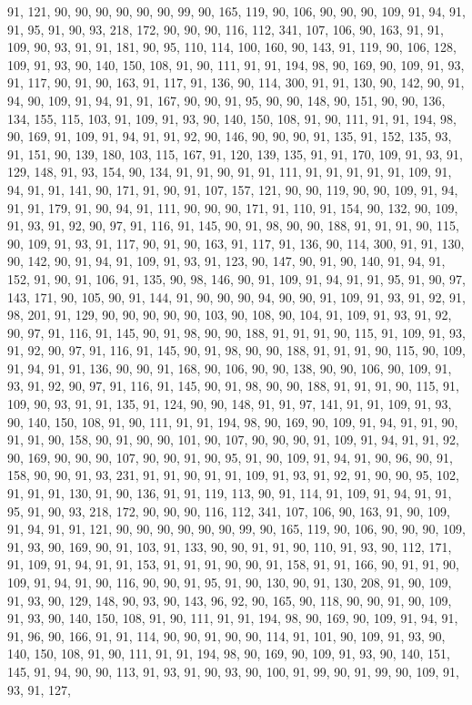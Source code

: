 \begin{sloppypar}
91, 121, 90, 90, 90, 90, 90, 90, 99, 90, 165, 119, 90, 106, 90, 90, 90, 109, 91, 94, 91, 91, 95, 91, 90, 93, 218, 172, 90, 90, 90, 116, 112, 341, 107, 106, 90, 163, 91, 91, 109, 90, 93, 91, 91, 181, 90, 95, 110, 114, 100, 160, 90, 143, 91, 119, 90, 106, 128, 109, 91, 93, 90, 140, 150, 108, 91, 90, 111, 91, 91, 194, 98, 90, 169, 90, 109, 91, 93, 91, 117, 90, 91, 90, 163, 91, 117, 91, 136, 90, 114, 300, 91, 91, 130, 90, 142, 90, 91, 94, 90, 109, 91, 94, 91, 91, 167, 90, 90, 91, 95, 90, 90, 148, 90, 151, 90, 90, 136, 134, 155, 115, 103, 91, 109, 91, 93, 90, 140, 150, 108, 91, 90, 111, 91, 91, 194, 98, 90, 169, 91, 109, 91, 94, 91, 91, 92, 90, 146, 90, 90, 90, 91, 135, 91, 152, 135, 93, 91, 151, 90, 139, 180, 103, 115, 167, 91, 120, 139, 135, 91, 91, 170, 109, 91, 93, 91, 129, 148, 91, 93, 154, 90, 134, 91, 91, 90, 91, 91, 111, 91, 91, 91, 91, 91, 109, 91, 94, 91, 91, 141, 90, 171, 91, 90, 91, 107, 157, 121, 90, 90, 119, 90, 90, 109, 91, 94, 91, 91, 179, 91, 90, 94, 91, 111, 90, 90, 90, 171, 91, 110, 91, 154, 90, 132, 90, 109, 91, 93, 91, 92, 90, 97, 91, 116, 91, 145, 90, 91, 98, 90, 90, 188, 91, 91, 91, 90, 115, 90, 109, 91, 93, 91, 117, 90, 91, 90, 163, 91, 117, 91, 136, 90, 114, 300, 91, 91, 130, 90, 142, 90, 91, 94, 91, 109, 91, 93, 91, 123, 90, 147, 90, 91, 90, 140, 91, 94, 91, 152, 91, 90, 91, 106, 91, 135, 90, 98, 146, 90, 91, 109, 91, 94, 91, 91, 95, 91, 90, 97, 143, 171, 90, 105, 90, 91, 144, 91, 90, 90, 90, 94, 90, 90, 91, 109, 91, 93, 91, 92, 91, 98, 201, 91, 129, 90, 90, 90, 90, 90, 103, 90, 108, 90, 104, 91, 109, 91, 93, 91, 92, 90, 97, 91, 116, 91, 145, 90, 91, 98, 90, 90, 188, 91, 91, 91, 90, 115, 91, 109, 91, 93, 91, 92, 90, 97, 91, 116, 91, 145, 90, 91, 98, 90, 90, 188, 91, 91, 91, 90, 115, 90, 109, 91, 94, 91, 91, 136, 90, 90, 91, 168, 90, 106, 90, 90, 138, 90, 90, 106, 90, 109, 91, 93, 91, 92, 90, 97, 91, 116, 91, 145, 90, 91, 98, 90, 90, 188, 91, 91, 91, 90, 115, 91, 109, 90, 93, 91, 91, 135, 91, 124, 90, 90, 148, 91, 91, 97, 141, 91, 91, 109, 91, 93, 90, 140, 150, 108, 91, 90, 111, 91, 91, 194, 98, 90, 169, 90, 109, 91, 94, 91, 91, 90, 91, 91, 90, 158, 90, 91, 90, 90, 101, 90, 107, 90, 90, 90, 91, 109, 91, 94, 91, 91, 92, 90, 169, 90, 90, 90, 107, 90, 90, 91, 90, 95, 91, 90, 109, 91, 94, 91, 90, 96, 90, 91, 158, 90, 90, 91, 93, 231, 91, 91, 90, 91, 91, 109, 91, 93, 91, 92, 91, 90, 90, 95, 102, 91, 91, 91, 130, 91, 90, 136, 91, 91, 119, 113, 90, 91, 114, 91, 109, 91, 94, 91, 91, 95, 91, 90, 93, 218, 172, 90, 90, 90, 116, 112, 341, 107, 106, 90, 163, 91, 90, 109, 91, 94, 91, 91, 121, 90, 90, 90, 90, 90, 90, 99, 90, 165, 119, 90, 106, 90, 90, 90, 109, 91, 93, 90, 169, 90, 91, 103, 91, 133, 90, 90, 91, 91, 90, 110, 91, 93, 90, 112, 171, 91, 109, 91, 94, 91, 91, 153, 91, 91, 91, 90, 90, 91, 158, 91, 91, 166, 90, 91, 91, 90, 109, 91, 94, 91, 90, 116, 90, 90, 91, 95, 91, 90, 130, 90, 91, 130, 208, 91, 90, 109, 91, 93, 90, 129, 148, 90, 93, 90, 143, 96, 92, 90, 165, 90, 118, 90, 90, 91, 90, 109, 91, 93, 90, 140, 150, 108, 91, 90, 111, 91, 91, 194, 98, 90, 169, 90, 109, 91, 94, 91, 91, 96, 90, 166, 91, 91, 114, 90, 90, 91, 90, 90, 114, 91, 101, 90, 109, 91, 93, 90, 140, 150, 108, 91, 90, 111, 91, 91, 194, 98, 90, 169, 90, 109, 91, 93, 90, 140, 151, 145, 91, 94, 90, 90, 113, 91, 93, 91, 90, 93, 90, 100, 91, 99, 90, 91, 99, 90, 109, 91, 93, 91, 127, 
\end{sloppypar}
